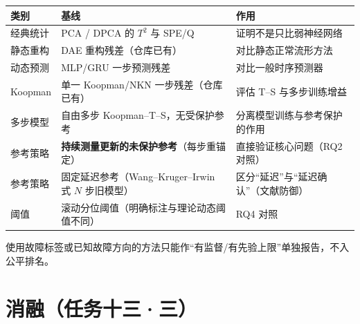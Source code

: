 \documentclass[11pt,a4paper]{ctexart}
\theoremstyle{remark}
\begin{document}
\begin{center}
\small
\begin{tabular}{L{0.14\textwidth}L{0.26\textwidth}L{0.44\textwidth}}
\toprule
类别 & 基线 & 作用 \\
\midrule
经典统计 & PCA / DPCA 的 $T^2$ 与 SPE/Q & 证明不是只比弱神经网络 \\
静态重构 & DAE 重构残差（仓库已有） & 对比静态正常流形方法 \\
动态预测 & MLP/GRU 一步预测残差 & 对比一般时序预测器 \\
Koopman & 单一 Koopman/NKN 一步残差（仓库已有） & 评估 T--S 与多步训练增益 \\
多步模型 & 自由多步 Koopman--T--S，无受保护参考 & 分离模型训练与参考保护的作用 \\
参考策略 & \textbf{持续测量更新的未保护参考}（每步重锚定） & 直接验证核心问题（RQ2 对照） \\
参考策略 & 固定延迟参考（Wang--Kruger--Irwin 式 $N$ 步旧模型） & 区分“延迟”与“延迟确认”（文献防御） \\
阈值 & 滚动分位阈值（明确标注与理论动态阈值不同） & RQ4 对照 \\
\bottomrule
\end{tabular}
\end{center}

使用故障标签或已知故障方向的方法只能作“有监督/有先验上限”单独报告，不入公平排名。

\section{消融（任务十三·三）}
\end{document}
